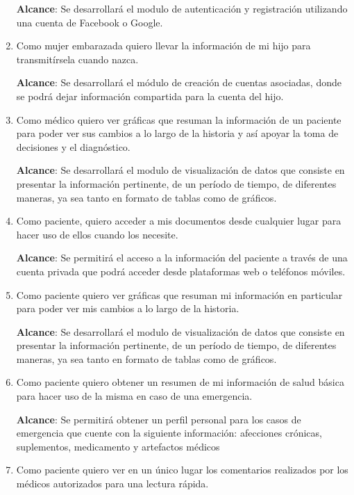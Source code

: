 \begin{enumerate}
    \textbf{Alcance}: Se desarrollará el modulo de autenticación y registración utilizando una cuenta de Facebook o Google.
 	\item Como mujer embarazada quiero llevar la información de mi hijo para transmitírsela cuando nazca.
    
    \textbf{Alcance}: Se desarrollará el módulo de creación de cuentas asociadas, donde se podrá dejar información compartida para la cuenta del hijo.
    
    \item Como médico quiero ver gráficas que resuman la información de un paciente para poder ver sus cambios a lo largo de la historia y así apoyar la toma de decisiones y el diagnóstico.
    
    \textbf{Alcance}: Se desarrollará el modulo de visualización de datos que consiste en presentar la información pertinente, de un período de tiempo, de diferentes maneras, ya sea tanto en formato de tablas como de gráficos. 
	\item Como paciente, quiero acceder a mis documentos desde cualquier lugar para hacer uso de ellos cuando los necesite.
    
    \textbf{Alcance}: Se permitirá el acceso a la información del paciente a través de una cuenta privada que podrá acceder desde plataformas web o teléfonos móviles. %
    
	\item Como paciente quiero ver gráficas que resuman mi información en particular para poder ver mis cambios a lo largo de la historia.
    
    \textbf{Alcance}: Se desarrollará el modulo de visualización de datos que consiste en presentar la información pertinente, de un período de tiempo, de diferentes maneras, ya sea tanto en formato de tablas como de gráficos. 
	\item Como paciente quiero obtener un resumen de mi información de salud básica para hacer uso de la misma en caso de una emergencia.
    
    \textbf{Alcance}: Se permitirá obtener un perfil personal para los casos de emergencia que cuente con la siguiente información: afecciones crónicas, suplementos, medicamento y artefactos médicos
	\item Como paciente quiero ver en un único lugar los comentarios realizados por los médicos autorizados para una lectura rápida.
    

\end{enumerate}
